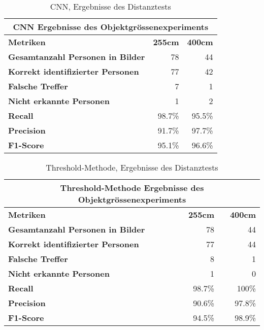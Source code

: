 {
	\renewcommand{\arraystretch}{1.3}
	\begin{table}[H]
		\scriptsize
		\centering
		\begin{tabularx}{.6\textwidth}{Xrr}
			\hline
			\multicolumn{3}{c}{\textbf{CNN Ergebnisse des Objektgrössenexperiments}}\\
			\hline
			\textbf{Metriken} & \textbf{255cm} & \textbf{400cm}\\
			\hline
			\textbf{Gesamtanzahl Personen in Bilder} & 78 & 44 \\
			\hline
			\textbf{Korrekt identifizierter Personen} & 77 & 42\\
			\hline
			\textbf{Falsche Treffer} & 7 & 1\\
			\hline
			\textbf{Nicht erkannte Personen} & 1 & 2\\
			\hline
			\textbf{Recall} & 98.7\% & 95.5\%\\
			\hline  
			\textbf{Precision} & 91.7\% & 97.7\%\\
			\hline
			\textbf{F1-Score} & 95.1\% & 96.6\%\\
			\hline
		\end{tabularx}
		\caption{CNN, Ergebnisse des Distanztests}
		\label{tbl:objectSizeCNN}
	\end{table}
	\begin{table}[H]
		\scriptsize
		\centering
		\begin{tabularx}{.6\textwidth}{Xrr}
			\hline
			\multicolumn{3}{c}{\textbf{Threshold-Methode Ergebnisse des Objektgrössenexperiments}}\\
			\hline
			\textbf{Metriken} & \textbf{255cm} & \textbf{400cm}\\
			\hline
			\textbf{Gesamtanzahl Personen in Bilder} & 78 & 44 \\
			\hline
			\textbf{Korrekt identifizierter Personen} & 77 & 44\\
			\hline
			\textbf{Falsche Treffer} & 8 & 1\\
			\hline
			\textbf{Nicht erkannte Personen} & 1 & 0\\
			\hline
			\textbf{Recall} & 98.7\% & 100\%\\
			\hline  
			\textbf{Precision} & 90.6\% & 97.8\%\\
			\hline
			\textbf{F1-Score} & 94.5\% & 98.9\%\\
			\hline
		\end{tabularx}
		\caption{Threshold-Methode, Ergebnisse des Distanztests}
		\label{tbl:objectSizeThresh}
	\end{table}
}

